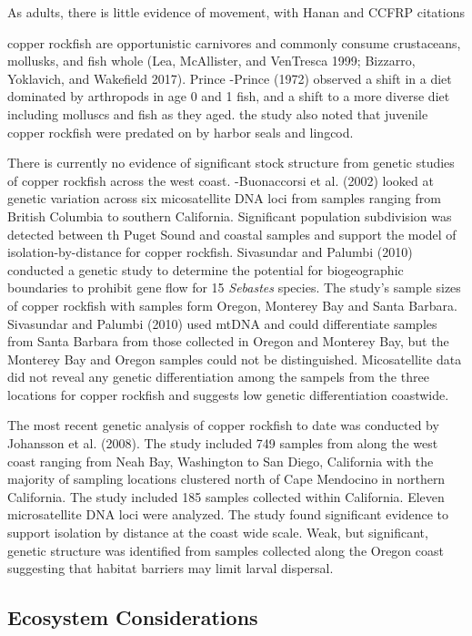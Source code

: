 \documentclass[11pt,
  english,
  letterpaper,
]{article}
\begin{document}
As adults, there is little evidence of movement, with Hanan and CCFRP citations

copper rockfish are opportunistic carnivores and commonly consume crustaceans, mollusks, and fish whole (Lea, McAllister, and VenTresca 1999; Bizzarro, Yoklavich, and Wakefield 2017). Prince -Prince (1972) observed a shift in a diet dominated by arthropods in age 0 and 1 fish, and a shift to a more diverse diet including molluscs and fish as they aged. the study also noted that juvenile copper rockfish were predated on by harbor seals and lingcod.

There is currently no evidence of significant stock structure from genetic studies of copper rockfish across the west coast. -Buonaccorsi et al. (2002) looked at genetic variation across six micosatellite DNA loci from samples ranging from British Columbia to southern California. Significant population subdivision was detected between th Puget Sound and coastal samples and support the model of isolation-by-distance for copper rockfish. Sivasundar and Palumbi (2010) conducted a genetic study to determine the potential for biogeographic boundaries to prohibit gene flow for 15 \emph{Sebastes} species. The study's sample sizes of copper rockfish with samples form Oregon, Monterey Bay and Santa Barbara. Sivasundar and Palumbi (2010) used mtDNA and could differentiate samples from Santa Barbara from those collected in Oregon and Monterey Bay, but the Monterey Bay and Oregon samples could not be distinguished. Micosatellite data did not reveal any genetic differentiation among the sampels from the three locations for copper rockfish and suggests low genetic differentiation coastwide.

The most recent genetic analysis of copper rockfish to date was conducted by Johansson et al. (2008). The study included 749 samples from along the west coast ranging from Neah Bay, Washington to San Diego, California with the majority of sampling locations clustered north of Cape Mendocino in northern California. The study included 185 samples collected within California. Eleven microsatellite DNA loci were analyzed. The study found significant evidence to support isolation by distance at the coast wide scale. Weak, but significant, genetic structure was identified from samples collected along the Oregon coast suggesting that habitat barriers may limit larval dispersal.

\hypertarget{ecosystem-considerations-1}{%
\subsection{Ecosystem Considerations}\label{ecosystem-considerations-1}}
\end{document}
